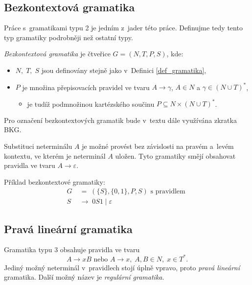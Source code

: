 \subsection*{Bezkontextová gramatika}
Práce s~gramatikami typu 2 je jedním z~jader této práce.
Definujme tedy tento typ gramatiky podrobněji než ostatní typy.
\begin{definition}\label{def_bkg}
    \emph{Bezkontextová gramatika} je čtveřice $G = (N, T, P, S)$, kde:
    \begin{itemize}
        \item $N,\; T,\; S$ jsou definovány stejně jako v~Definici \ref{def_gramatika}, 
        \item $P$ je množina přepisovacích pravidel ve tvaru $A \rightarrow \gamma $, $A \in N$ a $\gamma \in (N \cup T)^*$,
        \begin{itemize}[label=$\circ$]
            \item je tudíž podmnožinou kartézského součinu $P \subseteq  N \times (N \cup T)^*$. 
        \end{itemize}
    \end{itemize}
\end{definition}

\begin{convention}
    Pro označení bezkontextových gramatik bude v~textu dále využívána zkratka BKG.
\end{convention}

Substituci neterminálu $A$ je možné provést bez závislosti na pravém a~levém kontextu, ve kterém je neterminál $A$ uložen.
Tyto gramatiky smějí obsahovat pravidla ve tvaru $A \rightarrow \varepsilon$.

\begin{example}
    Příklad bezkontextové gramatiky:
    \begin{align*}
        G \; &= \; (\{S\}, \{0, 1\}, P, S) \text{ s~pravidlem } \\
        S \; &\rightarrow \; 0S1 \; | \; \varepsilon
    \end{align*}
\end{example}

\subsection*{Pravá lineární gramatika}
Gramatika typu 3 obsahuje pravidla ve tvaru
\begin{equation*}
    A \rightarrow xB \text { nebo } A \rightarrow x,\; A, B \in N,\; x \in T^*.
\end{equation*}
Jediný možný neterminál v~pravidlech stojí úplně vpravo, proto \emph{pravá lineární} gramatika.
Další možný název je \emph{regulární gramatika}.

